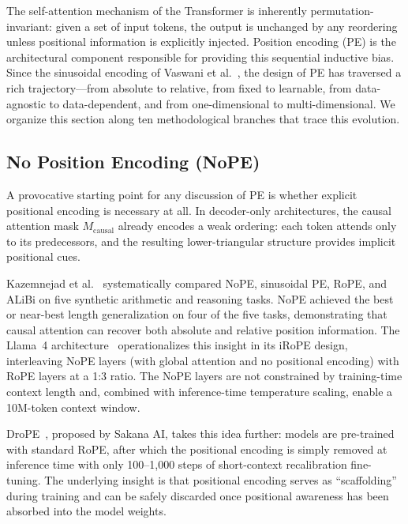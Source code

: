\label{sec:position_encoding}

The self-attention mechanism of the Transformer is inherently permutation-invariant: given a set of input tokens, the output is unchanged by any reordering unless positional information is explicitly injected. Position encoding (PE) is the architectural component responsible for providing this sequential inductive bias. Since the sinusoidal encoding of Vaswani et al.~\cite{vaswani2017attention}, the design of PE has traversed a rich trajectory---from absolute to relative, from fixed to learnable, from data-agnostic to data-dependent, and from one-dimensional to multi-dimensional. We organize this section along ten methodological branches that trace this evolution.

\subsection{No Position Encoding (NoPE)}
\label{subsec:nope}

A provocative starting point for any discussion of PE is whether explicit positional encoding is necessary at all. In decoder-only architectures, the causal attention mask $M_{\text{causal}}$ already encodes a weak ordering: each token attends only to its predecessors, and the resulting lower-triangular structure provides implicit positional cues.

Kazemnejad et al.~\cite{kazemnejad2023impact} systematically compared NoPE, sinusoidal PE, RoPE, and ALiBi on five synthetic arithmetic and reasoning tasks. NoPE achieved the best or near-best length generalization on four of the five tasks, demonstrating that causal attention can recover both absolute and relative position information. The Llama~4 architecture~\cite{llama4_2025} operationalizes this insight in its iRoPE design, interleaving NoPE layers (with global attention and no positional encoding) with RoPE layers at a 1:3 ratio. The NoPE layers are not constrained by training-time context length and, combined with inference-time temperature scaling, enable a 10M-token context window.

DroPE~\cite{gelberg2026drope}, proposed by Sakana AI, takes this idea further: models are pre-trained with standard RoPE, after which the positional encoding is simply removed at inference time with only 100--1,000 steps of short-context recalibration fine-tuning. The underlying insight is that positional encoding serves as ``scaffolding'' during training and can be safely discarded once positional awareness has been absorbed into the model weights.

